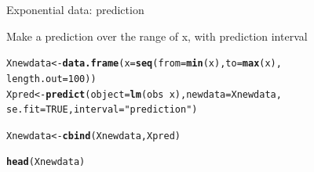 \documentclass[10pt]{beamer}\usepackage[]{graphicx}\usepackage[]{color}
\makeatletter
\newcommand{\hlnum}[1]{\textcolor[rgb]{0.686,0.059,0.569}{#1}}%
\newcommand{\hlstr}[1]{\textcolor[rgb]{0.192,0.494,0.8}{#1}}%
\newcommand{\hlopt}[1]{\textcolor[rgb]{0,0,0}{#1}}%
\newcommand{\hlstd}[1]{\textcolor[rgb]{0.345,0.345,0.345}{#1}}%
\newcommand{\hlkwb}[1]{\textcolor[rgb]{0.69,0.353,0.396}{#1}}%
\newcommand{\hlkwc}[1]{\textcolor[rgb]{0.333,0.667,0.333}{#1}}%
\newcommand{\hlkwd}[1]{\textcolor[rgb]{0.737,0.353,0.396}{\textbf{#1}}}%
\newenvironment{kframe}{%
 \def\at@end@of@kframe{}%
 \ifinner\ifhmode%
  \def\at@end@of@kframe{\end{minipage}}%
  \begin{minipage}{\columnwidth}%
 \fi\fi%
 \def\FrameCommand##1{\hskip\@totalleftmargin \hskip-\fboxsep
 \colorbox{shadecolor}{##1}\hskip-\fboxsep
     \hskip-\linewidth \hskip-\@totalleftmargin \hskip\columnwidth}%
 \MakeFramed {\advance\hsize-\width
   \@totalleftmargin\z@ \linewidth\hsize
   \@setminipage}}%
 {\par\unskip\endMakeFramed%
 \at@end@of@kframe}
\newenvironment{knitrout}{}{} %
\makeatother
\begin{document}
\begin{frame}[fragile]{Exponential data: prediction}

Make a prediction over the range of x, with prediction interval
\pause
\begin{knitrout}
\color{fgcolor}\begin{kframe}
\begin{alltt}
\hlstd{Xnewdata} \hlkwb{<-} \hlkwd{data.frame}\hlstd{(}\hlkwc{x}\hlstd{=}\hlkwd{seq}\hlstd{(}\hlkwc{from}\hlstd{=}\hlkwd{min}\hlstd{(x),} \hlkwc{to}\hlstd{=}\hlkwd{max}\hlstd{(x),}
                             \hlkwc{length.out} \hlstd{=} \hlnum{100}\hlstd{))}
\hlstd{Xpred} \hlkwb{<-} \hlkwd{predict}\hlstd{(}\hlkwc{object} \hlstd{=} \hlkwd{lm}\hlstd{(obs} \hlopt{~} \hlstd{x),} \hlkwc{newdata} \hlstd{= Xnewdata,}
                 \hlkwc{se.fit} \hlstd{=} \hlnum{TRUE}\hlstd{,} \hlkwc{interval} \hlstd{=} \hlstr{"prediction"}\hlstd{)}
\end{alltt}
\end{kframe}
\end{knitrout}
\pause
\begin{knitrout}
\color{fgcolor}\begin{kframe}
\begin{alltt}
\hlstd{Xnewdata} \hlkwb{<-} \hlkwd{cbind}\hlstd{(Xnewdata, Xpred)}
\end{alltt}
\end{kframe}
\end{knitrout}

\begin{knitrout}
\color{fgcolor}\begin{kframe}
\begin{alltt}
\hlkwd{head}\hlstd{(Xnewdata)}
\end{alltt}
\end{kframe}
\end{knitrout}

\end{frame}
\end{document}
